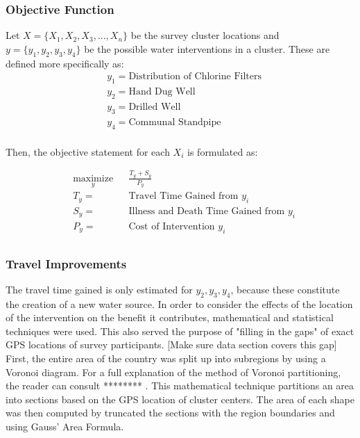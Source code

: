 \subsubsection*{Objective Function}
Let $X = \{X_1,X_2,X_3,...,X_n\}$ be the survey cluster locations and $y = \{y_1,y_2,y_3,y_4\}$ be the possible water interventions in a cluster.
These are defined more specifically as:
\begin{equation}
\begin{aligned} 
& y_1 = \text{Distribution of Chlorine Filters}\\
& y_2 = \text{Hand Dug Well}\\
& y_3 = \text{Drilled Well}\\
& y_4 = \text{Communal Standpipe}\\
\end{aligned}
\end{equation}

Then, the objective statement for each $X_i$ is formulated as: %

\begin{equation}
\begin{aligned}
& \underset{y}{\text{maximize}}
& & \frac{T_y + S_y}{P_y}  \\
& T_y =
& & \text{Travel Time Gained from } y_i \\
& S_y =
& & \text{Illness and Death Time Gained from } y_i \\
& P_y =
& & \text{Cost of Intervention } y_i \\
\end{aligned}
\end{equation}

\subsubsection*{Travel Improvements}
The travel time gained is only estimated for $y_2,y_3,y_4$, because these constitute the creation of a new water source.
In order to consider the effects of the location of the intervention on the benefit it contributes, mathematical and statistical techniques were used.
This also served the purpose of "filling in the gaps" of exact GPS locations of survey participants.
[Make sure data section covers this gap]
First, the entire area of the country was split up into subregions by using a Voronoi diagram.
For a full explanation of the method of Voronoi partitioning, the reader can consult ******** .
This mathematical technique partitions an area into sections based on the GPS location of cluster centers. %
The area of each shape was then computed by truncated the sections with the region boundaries and using Gauss' Area Formula. %

